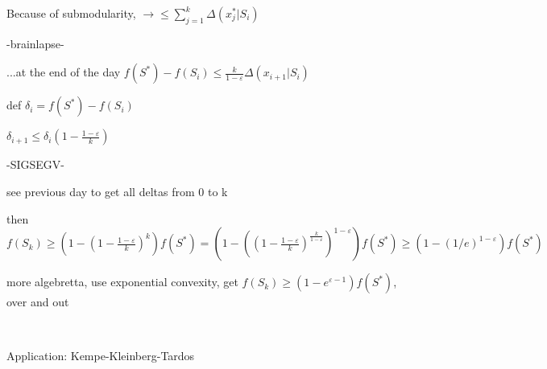 \documentclass{report}
\begin{document}
	Because of submodularity, $\to \leq \sum_{j=1}^{k}\Delta(x_j^* | S_i)$
	
	-brainlapse-
	
	...at the end of the day $f(S^*) - f (S_i) \leq \frac{k}{1-\varepsilon}\Delta(x_{i+1}| S_i)$
	
	def $\delta_i = f(S^*) - f(S_i)$
	
	$\delta_{i+1} \leq \delta_i(1-\frac{1-\varepsilon}{k})$
	
	-SIGSEGV-
	
	see previous day to get all deltas from 0 to k
	
	then $f(S_k) \geq (1-(1-\frac{1-\varepsilon}{k})^k)f(S^*)=(1-((1-\frac{1-\varepsilon}{k})^{\frac{k}{1-\varepsilon}})^{1-\varepsilon})f(S^*) \geq (1-(1/e)^{1-\varepsilon})f(S^*)$
	
	more algebretta, use exponential convexity, get $f(S_k) \geq (1-e^{\varepsilon-1})f(S^*)$, over and out
	
	\
	
	Application: Kempe-Kleinberg-Tardos
	
	
\end{document}
